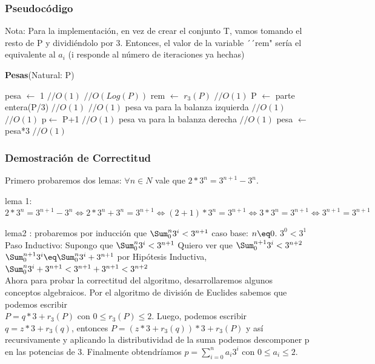 \documentclass[spanish,12pt]{article}
\begin{document}
\subsubsection{Pseudocódigo}

Nota: Para la implementación, en vez de crear el conjunto T, vamos tomando el resto de P y dividiéndolo por 3. Entonces, el valor de la variable ´´rem" sería el equivalente al $a_i$ (i responde al número de iteraciones ya hechas)

\begin{algorithm}[H]{\textbf{Pesas}(Natural: P)}
	\begin{algorithmic}[1]
		\State pesa $\gets$ 1 $//O(1)$
		$//O(Log(P))$
		 	\State rem $\gets$ $r_3 (P)$ $//O(1)$
	    		\State P $\gets $ parte entera(P/3) $//O(1)$
	    		 $//O(1)$
	    			\State pesa va para la balanza izquierda     $//O(1)$    			\Else
				 $//O(1)$
	    				\State p$\gets$ P+1   $//O(1)$
	    				\State pesa va para la balanza derecha  $//O(1)$
				\EndIf
			\EndIf
			\State pesa $\gets$ pesa*3  $//O(1)$
		\EndWhile
	\end{algorithmic}
\end{algorithm}



\subsubsection{Demostración de Correctitud}

Primero probaremos dos lemas:
$\forall n \in N$ vale que  $2*3^{n} = 3^{n+1}-3^{n}$.

lema 1:$ 2*3^{n} = 3^{n+1}-3^{n} \Longleftrightarrow 2*3^{n}+3^{n} = 3^{n+1} \Longleftrightarrow (2+1)*3^{n} = 3^{n+1} \Longleftrightarrow   3*3^{n} = 3^{n+1} \Longleftrightarrow  3^{n+1} = 3^{n+1}$ 

lema2 : probaremos por inducción que $ \Sum_{0}^{n}{3^{i}} < 3^{n+1}$
caso base: $n \eq 0$. $3^{0} < 3^{1}$
Paso Inductivo: 
	Supongo que $ \Sum_{0}^{n}{3^{i}} < 3^{n+1}$
	Quiero ver que $ \Sum_{0}^{n+1}{3^{i}} < 3^{n+2}$
	$ \Sum_{0}^{n+1}{3^{i}} \eq \Sum_{0}^{n}{3^{i}} + 3^{n+1}$
	por Hipótesis Inductiva, $\Sum_{0}^{n}{3^{i}} + 3^{n+1} < 3^{n+1} + 3^{n+1} < 3^{n+2} $
\\
Ahora para probar la correctitud del algoritmo, desarrollaremos algunos conceptos algebraicos.
Por el algoritmo de división de Euclides sabemos que podemos escribir \\  $P= q*3+ r_{3}(P)$ con $0\leq r_{3}(P) \leq 2 $. Luego, podemos escribir $q= z*3 + r_{3}(q)$, entonces $P= (z*3 + r_{3}(q))*3 +r_{3}(P)$ y así recursivamente y aplicando la distributividad de la suma podemos descomponer p en las potencias de 3. Finalmente obtendríamos $p= \sum_{i=0}^{n}{a_i 3^{i}} $ con $0 \leq a_i \leq 2$.
\end{document}
